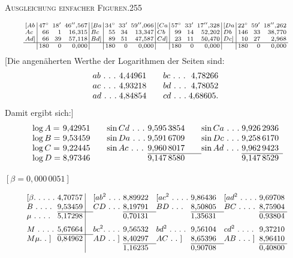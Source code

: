 \clearpage
\noindent\mbox{}\hfill\textsc{Ausgleichung einfacher Figuren.}\hfill255\par\medskip
\[
\scriptsize\setlength{\arraycolsep}{2pt}
\begin{array}{l|rrr|l|rrr|l|rrr|l|rrr}
[Ab&47^\circ&18'&46''{,}567&[Ba&34^\circ&33'&59''{,}066&[Ca&57^\circ&33'&17''{,}328&[Da&22^\circ&59'&18''{,}262\\
Ac&66&1&16{,}315&Bc&55&34&13{,}347&Cb&99&14&52{,}202&Db&146&33&38{,}770\\
Ad]&66&39&57{,}118&Bd]&89&51&47{,}587&Cd]&23&11&50{,}470&Dc]&10&27&2{,}968\\ \hline
&180&0&0{,}000&&180&0&0{,}000&&180&0&0{,}000&&180&0&0{,}000
\end{array}
\]
[Die angenäherten Werthe der Logarithmen der Seiten sind:
\[
\begin{array}{l@{\;}r@{\qquad}l@{\;}r}
ab\ .\ .\ .&4{,}44961&bc\ .\ .\ .&4{,}78266\\
ac\ .\ .\ .&4{,}93218&bd\ .\ .\ .&4{,}78052\\
ad\ .\ .\ .&4{,}84854&cd\ .\ .\ .&4{,}68605.
\end{array}
\]
Damit ergibt sich:]
\[
\begin{array}{l@{\;}r@{\qquad}l@{\;}r@{\qquad}l@{\;}r}
\log A=&9{,}42951&\sin Cd\ .\ .\ .&9{,}595\,3854&\sin Ca\ .\ .\ .&9{,}926\,2936\\
\log B=&9{,}53459&\sin Da\ .\ .\ .&9{,}591\,6709&\sin Dc\ .\ .\ .&9{,}258\,6170\\
\log C=&9{,}22445&\sin Ac\ .\ .\ .&9{,}960\,8017&\sin Ad\ .\ .\ .&9{,}962\,9423\\ \cline{4-4}\cline{6-6}
\log D=&8{,}97346&&9{,}147\,8580&&9{,}147\,8529
\end{array}
\]
\begin{flushright}$[\beta=0{,}000\,0051]$\hspace*{3.5cm}\end{flushright}
\[
\small\setlength{\arraycolsep}{3pt}
\begin{array}{l@{}r|@{\quad}l@{}r@{\quad}l@{}r@{\quad}l@{}r}
[\beta.\ .\ .\ .\ .\ &4{,}70757&[ab^2\ .\ .\ .\ &8{,}89922&[ac^2\ .\ .\ .\ .\ &\rlap{\raisebox{1.5ex}{\text{\tiny.}}}9{,}86436&[ad^2\ .\ .\ .\ .\ &9{,}69708\\
B\ .\ .\ .\ .\ &9{,}53459&CD\ .\ .\ .\ &8{,}19791&BD\ .\ .\ .\ &8{,}50805&BC\ .\ .\ .\ .\ &8{,}75904\\ \cline{2-2}\cline{4-4}\cline{6-6}\cline{8-8}
\mu\ .\ .\ .\ .\ &5{,}17298&&0{,}70131&&1{,}35631&&0{,}93804\\[5pt]
M\ .\ .\ .\ .\ &5{,}67664&bc^2.\ .\ .\ .\ &9{,}56532&bd^2\ .\ .\ .\ .\ &9{,}56104&cd^2\ .\ .\ .\ .\ &9{,}37210\\ \cline{2-2}
M\mu.\ .\ ]&0{,}84962&AD\ .\ .\ ]&8{,}40297&AC\ .\ .\ ]&8{,}65396&AB\ .\ .\ .\ ]&8{,}96410\\ \cline{4-4}\cline{6-6}\cline{8-8}
&&&1{,}16235&&0{,}90708&&0{,}40800
\end{array}
\]
